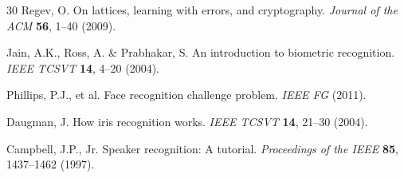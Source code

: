 \documentclass[11pt,a4paper]{article}
\begin{document}
\begin{thebibliography}{30}
Regev, O.
\newblock On lattices, learning with errors, and cryptography.
\newblock \emph{Journal of the ACM} \textbf{56}, 1--40 (2009).

Jain, A.K., Ross, A. \& Prabhakar, S.
\newblock An introduction to biometric recognition.
\newblock \emph{IEEE TCSVT} \textbf{14}, 4--20 (2004).

Phillips, P.J., et al.
\newblock Face recognition challenge problem.
\newblock \emph{IEEE FG} (2011).

Daugman, J.
\newblock How iris recognition works.
\newblock \emph{IEEE TCSVT} \textbf{14}, 21--30 (2004).

Campbell, J.P., Jr.
\newblock Speaker recognition: A tutorial.
\newblock \emph{Proceedings of the IEEE} \textbf{85}, 1437--1462 (1997).

\end{thebibliography}
\end{document}
